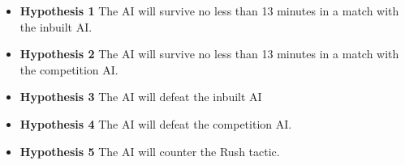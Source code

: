 \documentclass[journal]{IEEEtran}
\begin{document}
\begin{itemize}
\item \textbf{Hypothesis 1} The AI will survive no less than 13 minutes in a match with the inbuilt AI.
\item \textbf{Hypothesis 2} The AI will survive no less than 13 minutes in a match with the competition AI.
\item \textbf{Hypothesis 3} The AI will defeat the inbuilt AI
\item \textbf{Hypothesis 4} The AI will defeat the competition AI.
\item \textbf{Hypothesis 5} The AI will counter the Rush tactic.
\end{itemize}






\appendix
\end{document}
